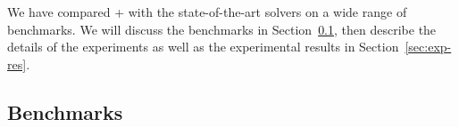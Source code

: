 
We have compared {\ostrich}+ with the state-of-the-art solvers on a wide range of benchmarks.  We will discuss the benchmarks in Section~\ref{sec:bench}, then describe the details of the experiments as well as the experimental results in Section~\ref{sec:exp-res}.



\subsection{Benchmarks}\label{sec:bench}
 

